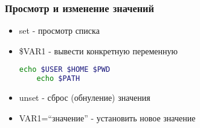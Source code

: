 \begin{frame}[fragile]
  \frametitle{Просмотр и изменение значений}
  \normalsize{ }
  \begin{itemize}
    \item \alert{set} - просмотр списка \pause
    \item \alert{\$VAR1} - вывести конкретную переменную \pause
      \begin{lstlisting}[language=sh,frame=single]
	echo $USER $HOME $PWD
	echo $PATH 
      \end{lstlisting} \pause 
    \item \alert{unset} - сброс (обнуление) значения
    \item \alert{VAR1=``значение''} - установить новое значение
  \end{itemize}

\end{frame}



